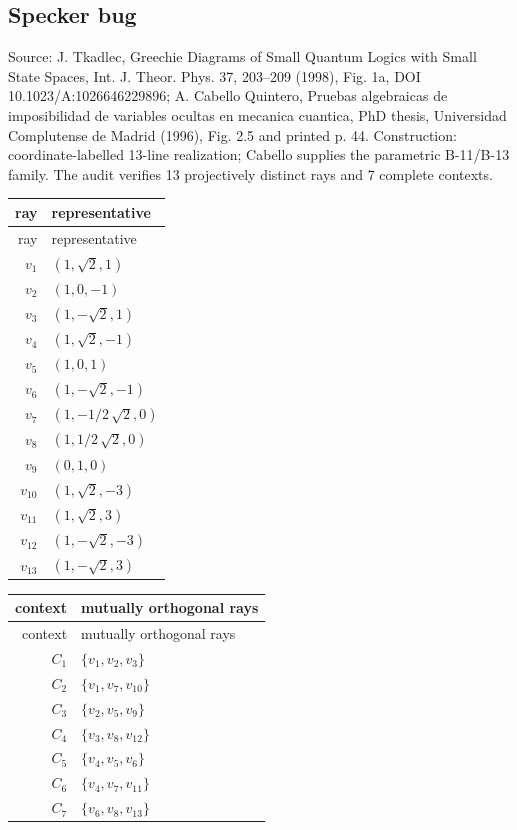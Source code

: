 \subsection{Specker bug}
\begingroup\sloppy Source: J. Tkadlec, Greechie Diagrams of Small Quantum Logics with Small State Spaces, Int. J. Theor. Phys. 37, 203--209 (1998), Fig. 1a, DOI 10.1023/A:1026646229896; A. Cabello Quintero, Pruebas algebraicas de imposibilidad de variables ocultas en mecanica cuantica, PhD thesis, Universidad Complutense de Madrid (1996), Fig. 2.5 and printed p. 44.  Construction: coordinate-labelled 13-line realization; Cabello supplies the parametric B-11/B-13 family. The audit verifies 13 projectively distinct rays and 7 complete contexts.\par\endgroup
\begin{longtable}{@{}r l@{}}
\toprule
ray & representative\\
\midrule
\endfirsthead
\toprule
ray & representative\\
\midrule
\endhead
$v_{1}$ & $(1,\sqrt{2},1)$\\
$v_{2}$ & $(1,0,-1)$\\
$v_{3}$ & $(1,-\sqrt{2},1)$\\
$v_{4}$ & $(1,\sqrt{2},-1)$\\
$v_{5}$ & $(1,0,1)$\\
$v_{6}$ & $(1,-\sqrt{2},-1)$\\
$v_{7}$ & $(1,-1/2\,\sqrt{2},0)$\\
$v_{8}$ & $(1,1/2\,\sqrt{2},0)$\\
$v_{9}$ & $(0,1,0)$\\
$v_{10}$ & $(1,\sqrt{2},-3)$\\
$v_{11}$ & $(1,\sqrt{2},3)$\\
$v_{12}$ & $(1,-\sqrt{2},-3)$\\
$v_{13}$ & $(1,-\sqrt{2},3)$\\
\bottomrule
\end{longtable}
\begin{longtable}{@{}r l@{}}
\toprule
context & mutually orthogonal rays\\
\midrule
\endfirsthead
\toprule
context & mutually orthogonal rays\\
\midrule
\endhead
$C_{1}$ & $\{v_{1},v_{2},v_{3}\}$\\
$C_{2}$ & $\{v_{1},v_{7},v_{10}\}$\\
$C_{3}$ & $\{v_{2},v_{5},v_{9}\}$\\
$C_{4}$ & $\{v_{3},v_{8},v_{12}\}$\\
$C_{5}$ & $\{v_{4},v_{5},v_{6}\}$\\
$C_{6}$ & $\{v_{4},v_{7},v_{11}\}$\\
$C_{7}$ & $\{v_{6},v_{8},v_{13}\}$\\
\bottomrule
\end{longtable}
